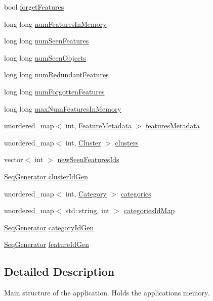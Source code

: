 \begin{DoxyCompactItemize}
bool \hyperlink{class_memory_ac3c18308c5e73bd2a54fcf5cb346c638}{forget\+Features}
\item 
long long \hyperlink{class_memory_a35ac41aee3f23446e2f34e492818007e}{num\+Features\+In\+Memory}
\item 
long long \hyperlink{class_memory_ae10824d7cf347234fd910fa3a4e6a9c7}{num\+Seen\+Features}
\item 
long long \hyperlink{class_memory_a3b7f28c5be1d201bb41cdbc90646fb4b}{num\+Seen\+Objects}
\item 
long long \hyperlink{class_memory_ae3c078fe2fb8bc942d13ede6a2eb951b}{num\+Redundant\+Features}
\item 
long long \hyperlink{class_memory_a01e573fd360050d1d87e4702eeec77ff}{num\+Forgotten\+Features}
\item 
long long \hyperlink{class_memory_a39621632b0a7c038b589cdb1c7402c02}{max\+Num\+Features\+In\+Memory}
\item 
unordered\+\_\+map$<$ int, \hyperlink{class_feature_metadata}{Feature\+Metadata} $>$ \hyperlink{class_memory_a70a3ffe94ecd25fa10c683b3fac6328b}{features\+Metadata}
\item 
unordered\+\_\+map$<$ int, \hyperlink{class_cluster}{Cluster} $>$ \hyperlink{class_memory_a9836b99d2ec4b06e98a90aa31d16439a}{clusters}
\item 
vector$<$ int $>$ \hyperlink{class_memory_a9bb05f7f61a8eb13c91fa9f99d1962a6}{new\+Seen\+Features\+Ids}
\item 
\hyperlink{class_seq_generator}{Seq\+Generator} \hyperlink{class_memory_aedc30fc567e03bfa3fa43fb47ba506f8}{cluster\+Id\+Gen}
\item 
unordered\+\_\+map$<$ int, \hyperlink{class_category}{Category} $>$ \hyperlink{class_memory_ab7733936ac814bc1f834a79fd868c8d9}{categories}
\item 
unordered\+\_\+map$<$ std\+::string, int $>$ \hyperlink{class_memory_aa40e026a0318c101754d065725a7b72d}{categories\+Id\+Map}
\item 
\hyperlink{class_seq_generator}{Seq\+Generator} \hyperlink{class_memory_a9e1a47adebdbbbade810a92215903ce1}{category\+Id\+Gen}
\item 
\hyperlink{class_seq_generator}{Seq\+Generator} \hyperlink{class_memory_a3c07af17879875325b9073fc77f56e3f}{feature\+Id\+Gen}
\end{DoxyCompactItemize}


\subsection{Detailed Description}
Main structure of the application. Holds the applications\textquotesingle{} memory. 

